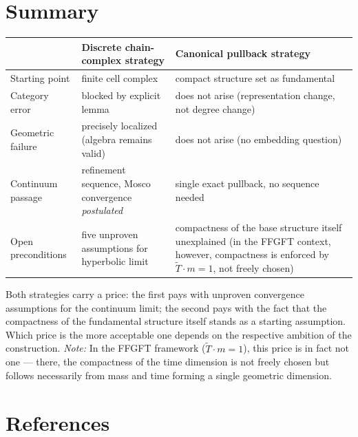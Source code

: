 \section{Summary}

\begin{tabular}{p{4.2cm}p{5.7cm}p{5.7cm}}
\toprule
& \textbf{Discrete chain-complex strategy} & \textbf{Canonical pullback strategy}\\
\midrule
Starting point & finite cell complex & compact structure set as fundamental\\
Category error & blocked by explicit lemma & does not arise (representation change, not degree change)\\
Geometric failure & precisely localized (algebra remains valid) & does not arise (no embedding question)\\
Continuum passage & refinement sequence, Mosco convergence \emph{postulated} & single exact pullback, no sequence needed\\
Open preconditions & five unproven assumptions for hyperbolic limit & compactness of the base structure itself unexplained (in the FFGFT context, however, compactness is enforced by $\tilde{T}\cdot m=1$, not freely chosen)\\
\bottomrule
\end{tabular}

\medskip
Both strategies carry a price: the first pays with unproven convergence
assumptions for the continuum limit; the second pays with the fact that
the compactness of the fundamental structure itself stands as a starting
assumption. Which price is the more acceptable one depends on the
respective ambition of the construction. \emph{Note:} In the FFGFT
framework ($\tilde{T}\cdot m=1$), this price is in fact not one ---
there, the compactness of the time dimension is not freely chosen but
follows necessarily from mass and time forming a single geometric
dimension.

\section{References}

